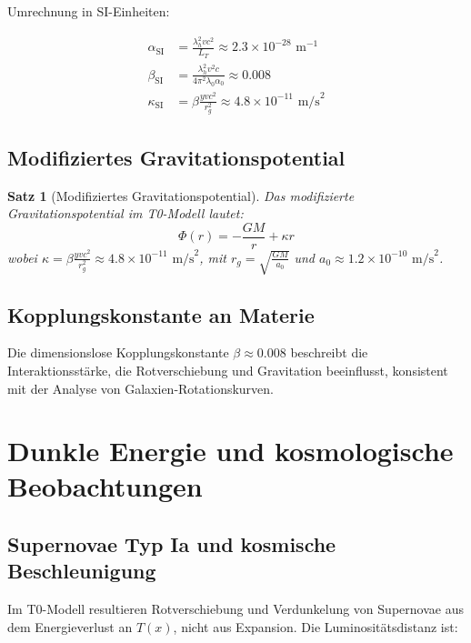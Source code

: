 \documentclass[a4paper,12pt]{article}
\newtheorem{theorem}{Satz}[section]
\theoremstyle{definition}
\theoremstyle{remark}
\newcommand{\Tfield}{T(x)} %
\begin{document}
	Umrechnung in SI-Einheiten:
	
	\begin{align}
		\alpha_{\text{SI}} &= \frac{\lambda_h^2 v c^2}{L_T} \approx 2.3 \times 10^{-28} \text{ m}^{-1} \\
		\beta_{\text{SI}} &= \frac{\lambda_h^2 v^2 c}{4\pi^2 \lambda_0 \alpha_0} \approx 0.008 \\
		\kappa_{\text{SI}} &= \beta \frac{y v c^2}{r_g^2} \approx 4.8 \times 10^{-11} \text{ m/s}^2
	\end{align}
	
	\subsection{Modifiziertes Gravitationspotential}
	
	\begin{theorem}[Modifiziertes Gravitationspotential]
		Das modifizierte Gravitationspotential im T0-Modell lautet:
		\begin{equation}
			\Phi(r) = -\frac{GM}{r} + \kappa r
		\end{equation}
		wobei \(\kappa = \beta \frac{y v c^2}{r_g^2} \approx 4.8 \times 10^{-11} \text{ m/s}^2\), mit \(r_g = \sqrt{\frac{GM}{a_0}}\) und \(a_0 \approx 1.2 \times 10^{-10} \text{ m/s}^2\).
	\end{theorem}
	
	\subsection{Kopplungskonstante an Materie}
	
	Die dimensionslose Kopplungskonstante \(\beta \approx 0.008\) beschreibt die Interaktionsstärke, die Rotverschiebung und Gravitation beeinflusst, konsistent mit der Analyse von Galaxien-Rotationskurven.
	
	\section{Dunkle Energie und kosmologische Beobachtungen}
	
	\subsection{Supernovae Typ Ia und kosmische Beschleunigung}
	
	Im T0-Modell resultieren Rotverschiebung und Verdunkelung von Supernovae aus dem Energieverlust an \(\Tfield\), nicht aus Expansion. Die Luminositätsdistanz ist:
	
\end{document}
